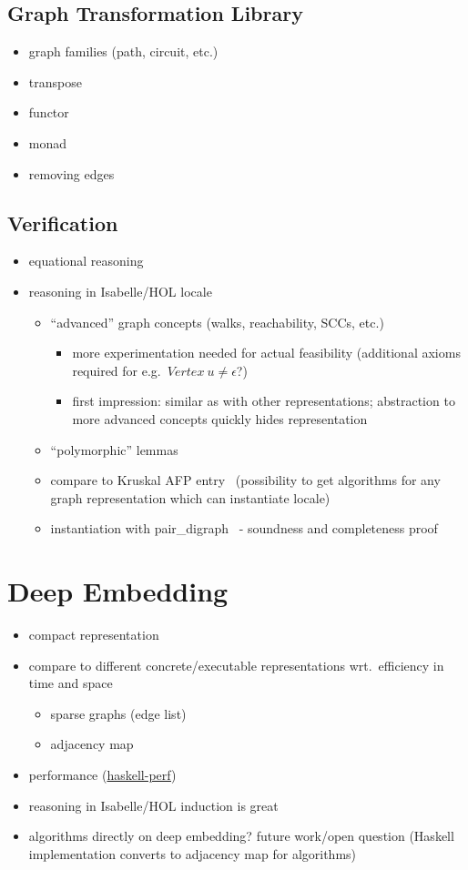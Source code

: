 \documentclass{article}
\begin{document}
\subsection{Graph Transformation Library}
\begin{itemize}
\item graph families (path, circuit, etc.)
\item transpose
\item functor
\item monad
\item removing edges
\end{itemize}
\subsection{Verification}
\begin{itemize}
\item equational reasoning
\item reasoning in Isabelle/HOL \textrightarrow{} locale
  \begin{itemize}
  \item ``advanced'' graph concepts (walks, reachability, SCCs, etc.)
    \begin{itemize}
    \item more experimentation needed for actual feasibility (additional axioms required
      for e.g.\ $Vertex\ u \neq \epsilon$?)
    \item first impression: similar as with other representations; abstraction
      to more advanced concepts quickly hides representation
    \end{itemize}
  \item ``polymorphic'' lemmas
  \item compare to Kruskal AFP entry~\cite{Kruskal-AFP} (possibility to get algorithms for
    any graph representation which can instantiate locale)
  \item instantiation with pair\_digraph~\cite{GraphTheory-AFP} - soundness and
    completeness proof
  \end{itemize}
\end{itemize}

\section{Deep Embedding}
\begin{itemize}
\item compact representation
\item compare to different concrete/executable representations wrt.\ efficiency
  in time and space 
  \begin{itemize}
  \item sparse graphs (edge list)
  \item adjacency map
  \end{itemize}
\item performance (\href{https://github.com/haskell-perf/graphs}{haskell-perf})
\item reasoning in Isabelle/HOL \textrightarrow{} induction is great
\item algorithms directly on deep embedding? \textrightarrow{} future work/open
  question (Haskell implementation converts to adjacency map for algorithms)
\end{itemize}
\end{document}
